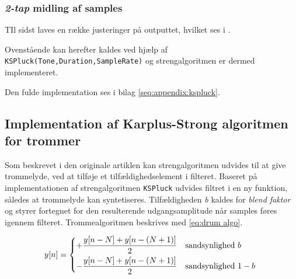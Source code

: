 \subsubsection{\emph{2-tap } midling af samples}


TIl sidst laves en række justeringer på outputtet, hvilket ses i .

Ovenstående kan herefter kaldes ved hjælp af \texttt{KSPluck(Tone,Duration,SampleRate)} og strengalgoritmen er dermed implementeret.

Den fulde implementation ses i bilag \ref{seq:appendix:kspluck}.

\subsection{Implementation af Karplus-Strong algoritmen for trommer}

Som beskrevet i den originale artiklen\cite{Karplus1983} kan strengalgoritmen udvides til at give trommelyde, ved at tilføje et tilfældighedselement i filteret.
Baseret på implementationen af strengalgoritmen \texttt{KSPluck} udvides filtret i en ny funktion, således at trommelyde kan syntetiseres.
Tilfældigheden \textit{b} kaldes for \textit{blend faktor} og styrer fortegnet for den resulterende udgangsamplitude når samples føres igennem filteret.
Trommealgoritmen beskrives med \eqref{eq:drum algo}.

\begin{equation}\label{eq:drum algo}
  y[n] =
  \begin{dcases*}
    +\frac{y[n-N] + y[n - (N+1)]}{2} & sandsynlighed \(b\)   \\
    -\frac{y[n-N] + y[n - (N+1)]}{2} & sandsynlighed \(1-b\)
  \end{dcases*}
\end{equation}

